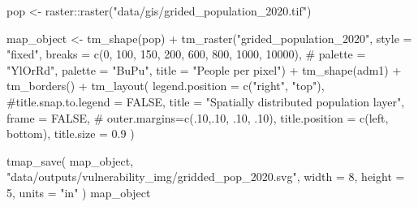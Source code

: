 \documentclass[
  letterpaper,
  DIV=11,
  numbers=noendperiod]{scrartcl}
\newenvironment{Shaded}{}{}
\newcommand{\AttributeTok}[1]{\textcolor[rgb]{0.84,0.23,0.29}{#1}}
\newcommand{\CommentTok}[1]{\textcolor[rgb]{0.42,0.45,0.49}{#1}}
\newcommand{\ConstantTok}[1]{\textcolor[rgb]{0.00,0.36,0.77}{#1}}
\newcommand{\DecValTok}[1]{\textcolor[rgb]{0.00,0.36,0.77}{#1}}
\newcommand{\FloatTok}[1]{\textcolor[rgb]{0.00,0.36,0.77}{#1}}
\newcommand{\FunctionTok}[1]{\textcolor[rgb]{0.44,0.26,0.76}{#1}}
\newcommand{\NormalTok}[1]{\textcolor[rgb]{0.14,0.16,0.18}{#1}}
\newcommand{\OtherTok}[1]{\textcolor[rgb]{0.44,0.26,0.76}{#1}}
\newcommand{\SpecialCharTok}[1]{\textcolor[rgb]{0.00,0.36,0.77}{#1}}
\newcommand{\StringTok}[1]{\textcolor[rgb]{0.01,0.18,0.38}{#1}}
\begin{document}
\begin{Shaded}
\begin{Highlighting}[]
\NormalTok{pop }\OtherTok{\textless{}{-}}\NormalTok{ raster}\SpecialCharTok{::}\FunctionTok{raster}\NormalTok{(}\StringTok{"data/gis/grided\_population\_2020.tif"}\NormalTok{)}

\NormalTok{map\_object }\OtherTok{\textless{}{-}}
\FunctionTok{tm\_shape}\NormalTok{(pop) }\SpecialCharTok{+}
  \FunctionTok{tm\_raster}\NormalTok{(}\StringTok{"grided\_population\_2020"}\NormalTok{, }
            \AttributeTok{style =} \StringTok{"fixed"}\NormalTok{, }
            \AttributeTok{breaks =} \FunctionTok{c}\NormalTok{(}\DecValTok{0}\NormalTok{, }\DecValTok{100}\NormalTok{, }\DecValTok{150}\NormalTok{, }\DecValTok{200}\NormalTok{, }\DecValTok{600}\NormalTok{, }\DecValTok{800}\NormalTok{, }\DecValTok{1000}\NormalTok{, }\DecValTok{10000}\NormalTok{),}
            \CommentTok{\# palette = "YlOrRd",}
            \AttributeTok{palette =} \StringTok{"BuPu"}\NormalTok{,}
            \AttributeTok{title =} \StringTok{"People per pixel"}\NormalTok{) }\SpecialCharTok{+}
  \FunctionTok{tm\_shape}\NormalTok{(adm1) }\SpecialCharTok{+}
  \FunctionTok{tm\_borders}\NormalTok{() }\SpecialCharTok{+}
  \FunctionTok{tm\_layout}\NormalTok{(}
    \AttributeTok{legend.position =} \FunctionTok{c}\NormalTok{(}\StringTok{"right"}\NormalTok{, }\StringTok{"top"}\NormalTok{),}
    \CommentTok{\#title.snap.to.legend = FALSE,}
    \AttributeTok{title =} 
      \StringTok{"Spatially distributed population layer"}\NormalTok{,}
    \AttributeTok{frame =} \ConstantTok{FALSE}\NormalTok{,}
\CommentTok{\#            outer.margins=c(.10,.10, .10, .10), }
            \AttributeTok{title.position =} \FunctionTok{c}\NormalTok{(}\StringTok{\textquotesingle{}left\textquotesingle{}}\NormalTok{, }\StringTok{\textquotesingle{}bottom\textquotesingle{}}\NormalTok{),}
            \AttributeTok{title.size =} \FloatTok{0.9}
\NormalTok{    )}

\FunctionTok{tmap\_save}\NormalTok{(}
\NormalTok{  map\_object,}
  \StringTok{"data/outputs/vulnerability\_img/gridded\_pop\_2020.svg"}\NormalTok{,}
  \AttributeTok{width =} \DecValTok{8}\NormalTok{,}
  \AttributeTok{height =} \DecValTok{5}\NormalTok{,}
  \AttributeTok{units =} \StringTok{"in"}
\NormalTok{)}
\NormalTok{map\_object}
\end{Highlighting}
\end{Shaded}
\end{document}
